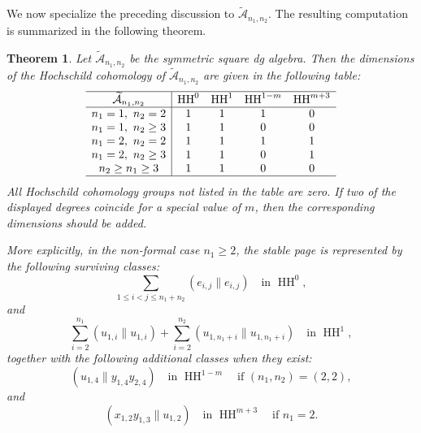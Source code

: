 \documentclass[a4paper, reqno, 11pt]{amsart}
\newtheorem{theorem}{Theorem}[section]
\theoremstyle{definition}
\begin{document}
We now specialize the preceding discussion to
\(\widetilde{\mathcal A}_{n_1,n_2}\). The resulting computation is summarized in
the following theorem.
\begin{theorem}\label{thm:dg_HH_dimensions}
	Let \(\widetilde{\mathcal A}_{n_1,n_2}\) be the symmetric square dg algebra. Then the dimensions of the Hochschild cohomology of \(\widetilde{\mathcal A}_{n_1,n_2}\) are given in the following table:
	\[
	\begin{array}{c|cccc}
		\hline
		\widetilde{\mathcal A}_{n_1,n_2}
		&
		\operatorname{HH}^{0}
		&
		\operatorname{HH}^{1}
		&
		\operatorname{HH}^{1-m}
		&
		\operatorname{HH}^{m+3}
		\\
		\hline
		n_1=1,\ n_2=2
		&
		1 & 1 & 1 & 0
		\\
		n_1=1,\ n_2\ge 3
		&
		1 & 1 & 0 & 0
		\\
		n_1=2,\ n_2=2
		&
		1 & 1 & 1 & 1
		\\
		n_1=2,\ n_2\ge 3
		&
		1 & 1 & 0 & 1
		\\
		n_2\ge n_1\ge 3
		&
		1 & 1 & 0 & 0
		\\
		\hline
	\end{array}
	\]
	All Hochschild cohomology groups not listed in the table are zero. If two of
	the displayed degrees coincide for a special value of \(m\), then the
	corresponding dimensions should be added.
	
	More explicitly, in the non-formal case \(n_1\ge 2\), the stable page is
	represented by the following surviving classes:
	\[
	\sum\limits_{1\le i<j\le n_1+n_2}(e_{i,j}\parallel e_{i,j}) \quad \text{in } \operatorname{HH}^0,
	\]
	and
	\[
	\sum\limits_{i=2}^{n_1}(u_{1,i}\parallel u_{1,i})
	+
	\sum\limits_{i=2}^{n_2}(u_{1,n_1+i}\parallel u_{1,n_1+i}) \quad \text{in } \operatorname{HH}^1,
	\]
	together with the following additional classes when they exist:
	\[
	(u_{1,4}\parallel y_{1,4}y_{2,4}) \quad \text{in } \operatorname{HH}^{1-m}
	\quad
	\text{if }(n_1,n_2)=(2,2),
	\]
	and
	\[
	(x_{1,2}y_{1,3}\parallel u_{1,2}) \quad \text{in } \operatorname{HH}^{m+3}
	\quad
	\text{if }n_1=2.
	\]
\end{theorem}
\end{document}
